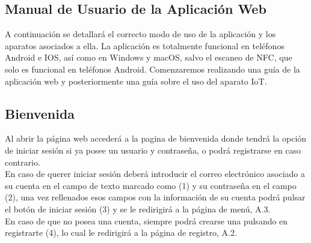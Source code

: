 \documentclass[12pt]{report}
\begin{document}
\begin{appendices}

\chapter{Manual de Usuario de la Aplicación Web}
A continuación se detallará el correcto modo de uso de la aplicación y los aparatos asociados a ella.
La aplicación es totalmente funcional en teléfonos Android e IOS, así como en Windows y macOS, salvo el escaneo de NFC, que solo es funcional en teléfonos Android.
Comenzaremos realizando una guía de la aplicación web y posteriormente una guía sobre el uso del aparato IoT.
\newpage
\section{Bienvenida}
Al abrir la página web accederá a la pagina de bienvenida donde tendrá la opción de iniciar sesión si ya posee un usuario y contraseña, o podrá registrarse en caso contrario.
\\En caso de querer iniciar sesión deberá introducir el correo electrónico asociado a su cuenta en el campo de texto marcado como (1) y su contraseña en el campo (2), una vez rellenados esos campos con la información de su cuenta podrá pulsar el botón de iniciar sesión (3) y se le redirigirá a la página de menú, A.3. 
\\En caso de que no posea una cuenta, siempre podrá crearse una pulsando en registrarte (4), lo cual le redirigirá a la página de registro, A.2.\\
\begin{figure}[H]
    \centering

\end{figure}
\end{appendices}
\end{document}
